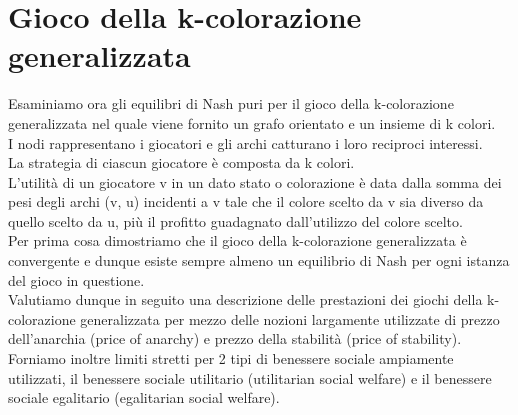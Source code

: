 \chapter{Gioco della k-colorazione generalizzata}
\justify
Esaminiamo ora gli equilibri di Nash puri per il gioco della k-colorazione generalizzata nel quale viene fornito un grafo orientato e un insieme di k colori.\\
I nodi rappresentano i giocatori e gli archi catturano i loro reciproci interessi.\\
La strategia di ciascun giocatore è composta da k colori.\\
L'utilità di un giocatore v in un dato stato o colorazione è data dalla somma dei pesi degli archi (v, u) incidenti a v tale che il colore scelto da v sia diverso da quello scelto da u, più il profitto guadagnato dall'utilizzo del colore scelto.\\
Per prima cosa dimostriamo che il gioco della k-colorazione generalizzata è convergente e dunque esiste sempre almeno un equilibrio di Nash per ogni istanza del gioco in questione.\\
Valutiamo dunque in seguito una descrizione delle prestazioni dei giochi della k-colorazione generalizzata per mezzo delle nozioni largamente utilizzate di prezzo dell'anarchia (price of anarchy) e prezzo della stabilità (price of stability).\\
Forniamo inoltre limiti stretti per 2 tipi di benessere sociale ampiamente utilizzati, il benessere sociale utilitario (utilitarian social welfare) e il benessere sociale egalitario (egalitarian social welfare).\newline

